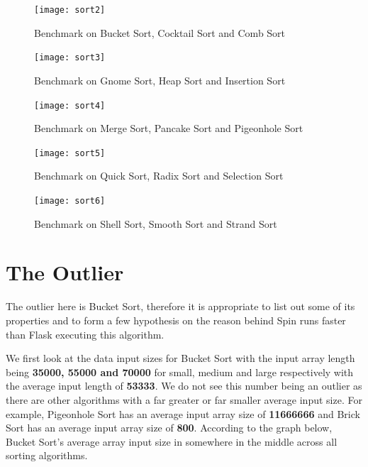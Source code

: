 \bigskip
\begin{figure}[hp]
\centering
\texttt{[image: sort2]}
\caption{\footnotesize{Benchmark on Bucket Sort, Cocktail Sort and Comb Sort}}
\captionsetup{aboveskip=0pt,font=it}
\end{figure}
\bigskip

\bigskip
\begin{figure}[hp]
\centering
\texttt{[image: sort3]}
\caption{\footnotesize{Benchmark on Gnome Sort, Heap Sort and Insertion Sort}}
\captionsetup{aboveskip=0pt,font=it}
\end{figure}
\bigskip

\bigskip
\begin{figure}[hp]
\centering
\texttt{[image: sort4]}
\caption{\footnotesize{Benchmark on Merge Sort, Pancake Sort and Pigeonhole Sort}}
\captionsetup{aboveskip=0pt,font=it}
\end{figure}
\bigskip

\newpage
\bigskip
\begin{figure}[hp]
\centering
\texttt{[image: sort5]}
\caption{\footnotesize{Benchmark on Quick Sort, Radix Sort and Selection Sort}}
\captionsetup{aboveskip=0pt,font=it}
\end{figure}
\bigskip

\bigskip
\begin{figure}[hp]
\centering
\texttt{[image: sort6]}
\caption{\footnotesize{Benchmark on Shell Sort, Smooth Sort and Strand Sort}}
\captionsetup{aboveskip=0pt,font=it}
\end{figure}
\bigskip

\bigskip
\section{The Outlier}

The outlier here is Bucket Sort, therefore it is appropriate to list out some of its properties and to form a few hypothesis on the reason behind Spin runs faster than Flask executing this algorithm.

We first look at the data input sizes for Bucket Sort with the input array length being \textbf{35000, 55000 and 70000} for small, medium and large respectively with the average input length of \textbf{53333}. We do not see this number being an outlier as there are other algorithms with a far greater or far smaller average input size. For example, Pigeonhole Sort has an average input array size of \textbf{11666666} and Brick Sort has an average input array size of \textbf{800}. According to the graph below, Bucket Sort's average array input size in somewhere in the middle across all sorting algorithms.


